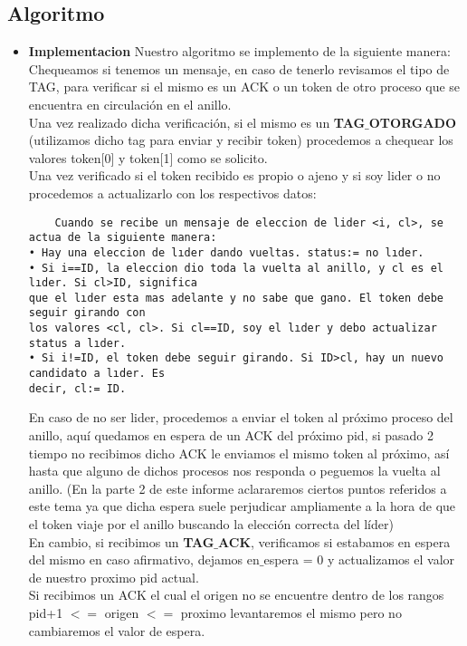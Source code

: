 
\subsection{Algoritmo}
\begin{itemize}
 \item \textbf{Implementacion}
Nuestro algoritmo se implemento de la siguiente manera:\\

Chequeamos si tenemos un mensaje, en caso de tenerlo revisamos el tipo de TAG, para verificar
si el mismo es un ACK o un token de otro proceso que se encuentra en circulación en el anillo.\\ Una vez realizado dicha verificación, si el mismo es un \textbf{TAG$\_$OTORGADO} (utilizamos dicho tag para enviar y recibir token) procedemos a chequear los valores token[0] y token[1] como se solicito.\\
Una vez verificado si el token recibido es propio o ajeno y si soy lider o no procedemos a actualizarlo con los respectivos datos:\\

\begin{verbatim}
	Cuando se recibe un mensaje de eleccion de lider <i, cl>, se actua de la siguiente manera:
• Hay una eleccion de lıder dando vueltas. status:= no lıder.
• Si i==ID, la eleccion dio toda la vuelta al anillo, y cl es el lıder. Si cl>ID, significa
que el lıder esta mas adelante y no sabe que gano. El token debe seguir girando con
los valores <cl, cl>. Si cl==ID, soy el lıder y debo actualizar status a lıder.
• Si i!=ID, el token debe seguir girando. Si ID>cl, hay un nuevo candidato a lıder. Es
decir, cl:= ID.
\end{verbatim}

En caso de no ser lider, procedemos a enviar el token al próximo proceso del anillo, aquí quedamos en espera de un ACK del próximo pid, si pasado 2 tiempo no recibimos dicho ACK le enviamos el mismo token al próximo, así hasta que alguno de dichos procesos nos responda o peguemos la vuelta al anillo. (En la parte 2 de este informe aclararemos ciertos puntos referidos a este tema ya que dicha espera suele perjudicar ampliamente a la hora de que el token viaje por el anillo buscando la elección correcta del líder)\\

En cambio, si recibimos un \textbf{TAG$\_$ACK}, verificamos si estabamos en espera del mismo en caso afirmativo, dejamos en$\_$espera = 0 y actualizamos el valor de nuestro proximo pid actual.\\
Si recibimos un ACK el cual el origen no se encuentre dentro de los rangos pid+1 $<=$ origen $<=$ proximo levantaremos el mismo pero no cambiaremos el valor de espera.\\

\end{itemize}
